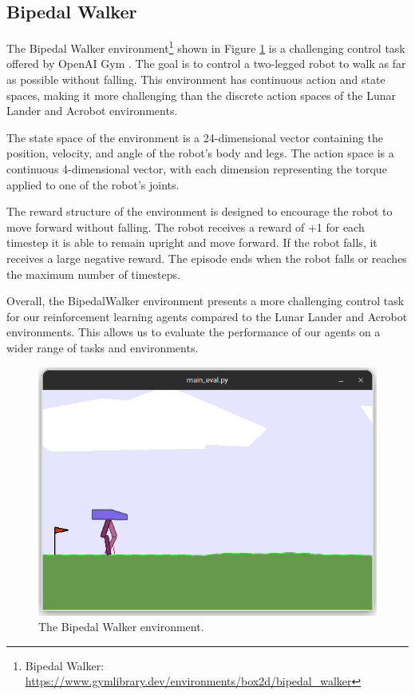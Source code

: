 \subsection{Bipedal Walker}


The Bipedal Walker environment\footnote{Bipedal Walker: \url{https://www.gymlibrary.dev/environments/box2d/bipedal_walker}} shown in Figure \ref{bipedal-walker-env} is a challenging control task offered by OpenAI Gym \cite{brockman2016openai}. The goal is to control a two-legged robot to walk as far as possible without falling. This environment has continuous action and state spaces, making it more challenging than the discrete action spaces of the Lunar Lander and Acrobot environments.

The state space of the environment is a 24-dimensional vector containing the position, velocity, and angle of the robot's body and legs. The action space is a continuous 4-dimensional vector, with each dimension representing the torque applied to one of the robot's joints.

The reward structure of the environment is designed to encourage the robot to move forward without falling. The robot receives a reward of +1 for each timestep it is able to remain upright and move forward. If the robot falls, it receives a large negative reward. The episode ends when the robot falls or reaches the maximum number of timesteps.

Overall, the BipedalWalker environment presents a more challenging control task for our reinforcement learning agents compared to the Lunar Lander and Acrobot environments. This allows us to evaluate the performance of our agents on a wider range of tasks and environments.

\begin{figure}[htbp]
    \centerline{\includegraphics[width=\columnwidth]{./img/bipedal-walker-env.png}}
    \caption{The Bipedal Walker environment.}
    \label{bipedal-walker-env}
\end{figure}


